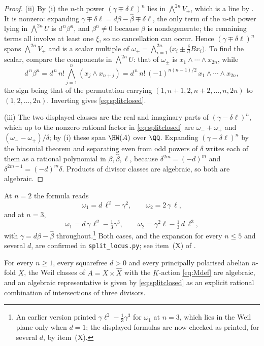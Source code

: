 \begin{proof}
(ii) By (i) the $n$-th power $(\gamma\mp\delta\ell)^{n}$ lies in
$\bigwedge^{2n}V_{\pm}$, which is a line by . It is
nonzero: expanding $\gamma\mp\delta\ell=d\beta-\widehat{\beta}\mp\delta\ell$,
the only term of the $n$-th power lying in $\bigwedge^{2n}U$ is
$d^{\,n}\beta^{n}$, and $\beta^{n}\ne0$ because $\beta$ is nondegenerate;
the remaining terms all involve at least one $\xi$, so no cancellation can
occur. Hence $(\gamma\mp\delta\ell)^{n}$ spans $\bigwedge^{2n}V_{\pm}$ and is a
scalar multiple of $\omega_{\pm}=\bigwedge_{i=1}^{2n}\bigl(x_{i}\pm\tfrac{\delta}{d}Bx_{i}\bigr)$.
To find the scalar, compare the components in $\bigwedge^{2n}U$: that of
$\omega_{\pm}$ is $x_{1}\wedge\cdots\wedge x_{2n}$, while
\[
  d^{\,n}\beta^{n}=d^{\,n}\,n!\bigwedge_{j=1}^{n}(x_{j}\wedge x_{n+j})
  =d^{\,n}\,n!\,(-1)^{n(n-1)/2}\,x_{1}\wedge\cdots\wedge x_{2n},
\]
the sign being that of the permutation carrying
$(1,n+1,2,n+2,\dots,n,2n)$ to $(1,2,\dots,2n)$. Inverting gives
\eqref{eq:splitclosed}.

(iii) The two displayed classes are the real and imaginary parts of
$(\gamma-\delta\ell)^{n}$, which up to the nonzero rational factor in
\eqref{eq:splitclosed} are $\omega_{-}+\omega_{+}$ and
$(\omega_{-}-\omega_{+})/\delta$; by (i) these span
$\HW(A)$ over $\QQ$. Expanding $(\gamma-\delta\ell)^{n}$ by the binomial
theorem and separating even from odd powers of $\delta$ writes each of them as
a rational polynomial in $\beta,\widehat{\beta},\ell$, because
$\delta^{2m}=(-d)^{m}$ and $\delta^{2m+1}=(-d)^{m}\delta$. Products of divisor
classes are algebraic, so both are algebraic.
\end{proof}

\begin{example}\label{ex:splitsmall}
At $n=2$ the formula reads
\[
  \omega_{1}=d\,\ell^{2}-\gamma^{2},
  \qquad
  \omega_{2}=2\,\gamma\,\ell,
\]
and at $n=3$,
\[
  \omega_{1}=d\,\gamma\,\ell^{2}-\tfrac13\gamma^{3},
  \qquad
  \omega_{2}=\gamma^{2}\ell-\tfrac13\,d\,\ell^{3},
\]
with $\gamma=d\beta-\widehat{\beta}$ throughout.\footnote{An earlier version
printed $\gamma\ell^{2}-\frac13\gamma^{3}$ for $\omega_{1}$ at $n=3$, which lies
in the Weil plane only when $d=1$; the displayed formulas are now checked as
printed, for several $d$, by item~(X).} Both cases, and the expansion
for every $n\le5$ and several $d$, are confirmed in
\texttt{split\_locus.py}; see item~(X) of .
\end{example}

\begin{corollary}\label{cor:splitalgebraic}
For every $n\ge1$, every squarefree $d>0$ and every principally polarised
abelian $n$-fold $X$, the Weil classes of $A=X\times\widehat{X}$ with the
$K$-action \eqref{eq:Mdef} are algebraic, and an algebraic representative is
given by \eqref{eq:splitclosed} as an explicit rational combination of
intersections of three divisors.
\end{corollary}


